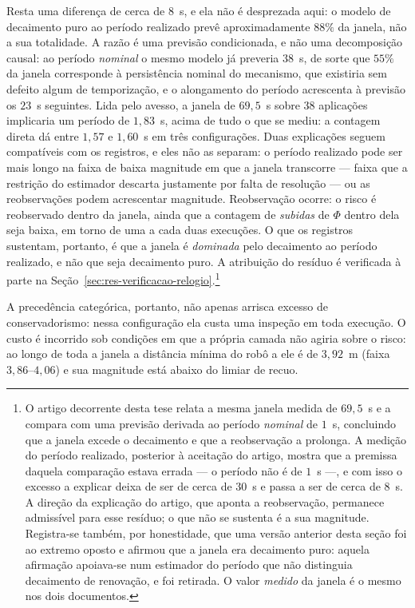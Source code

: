 Resta uma diferença de cerca de $8$~s, e ela não é desprezada aqui: o modelo de
decaimento puro ao período realizado prevê aproximadamente $88\%$ da janela, não a sua
totalidade. A razão é uma previsão condicionada, e não uma decomposição causal: ao
período \emph{nominal} o mesmo modelo já preveria $38$~s, de sorte que $55\%$ da janela
corresponde à persistência nominal do mecanismo, que existiria sem defeito algum de
temporização, e o alongamento do período acrescenta à previsão os $23$~s seguintes. Lida pelo avesso, a
janela de $69{,}5$~s sobre $38$ aplicações implicaria um período de $1{,}83$~s, acima de
tudo o que se mediu: a contagem direta dá entre $1{,}57$ e $1{,}60$~s em três
configurações. Duas explicações seguem compatíveis com os registros, e eles não as
separam: o período realizado pode ser mais longo na faixa de baixa magnitude em que a
janela transcorre --- faixa que a restrição do estimador descarta justamente por falta de
resolução --- ou as reobservações podem acrescentar magnitude. Reobservação ocorre: o risco é reobservado
dentro da janela, ainda que a contagem de \emph{subidas} de $\Phi$ dentro dela seja
baixa, em torno de uma a cada duas execuções. O que os registros sustentam, portanto, é
que a janela é \emph{dominada} pelo decaimento ao período realizado, e não que seja
decaimento puro. A atribuição do
resíduo é verificada à parte na Seção~\ref{sec:res-verificacao-relogio}.\footnote{O artigo decorrente
desta tese \cite{MirandaNeto2026TwoLayer} relata a mesma janela medida de $69{,}5$~s e
a compara com uma previsão derivada ao período \emph{nominal} de $1$~s, concluindo que
a janela excede o decaimento e que a reobservação a prolonga. A medição do período
realizado, posterior à aceitação do artigo, mostra que a premissa daquela comparação
estava errada --- o período não é de $1$~s ---, e com isso o excesso a explicar deixa de
ser de cerca de $30$~s e passa a ser de cerca de $8$~s. A direção da explicação do
artigo, que aponta a reobservação, permanece admissível para esse resíduo; o que não se
sustenta é a sua magnitude. Registra-se também, por honestidade, que uma versão anterior
desta seção foi ao extremo oposto e afirmou que a janela era decaimento puro: aquela
afirmação apoiava-se num estimador do período que não distinguia decaimento de
renovação, e foi retirada. O valor \emph{medido} da janela é o mesmo nos dois
documentos.}

A precedência categórica, portanto, não apenas arrisca excesso de conservadorismo:
nessa configuração ela custa uma inspeção em toda execução. O custo é incorrido sob
condições em que a própria camada não agiria sobre o risco: ao longo de toda a
janela a distância mínima do robô a ele é de $3{,}92$~m (faixa $3{,}86$--$4{,}06$) e
sua magnitude está abaixo do limiar de recuo.

